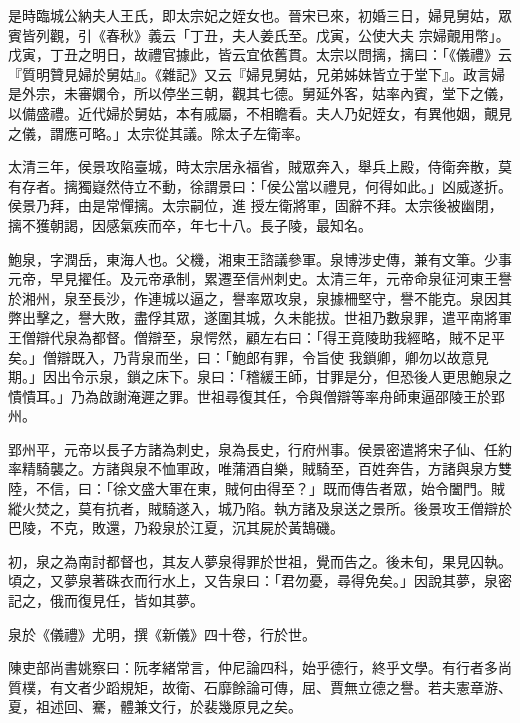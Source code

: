 \begin{pinyinscope}
 是時臨城公納夫人王氏，即太宗妃之姪女也。晉宋已來，初婚三日，婦見舅姑，眾賓皆列觀，引《春秋》義云「丁丑，夫人姜氏至。戊寅，公使大夫
 宗婦覿用幣」。戊寅，丁丑之明日，故禮官據此，皆云宜依舊貫。太宗以問摛，摛曰：「《儀禮》云『質明贊見婦於舅姑』。《雜記》又云『婦見舅姑，兄弟姊妹皆立于堂下』。政言婦是外宗，未審嫻令，所以停坐三朝，觀其七德。舅延外客，姑率內賓，堂下之儀，以備盛禮。近代婦於舅姑，本有戚屬，不相瞻看。夫人乃妃姪女，有異他姻，覿見之儀，謂應可略。」太宗從其議。除太子左衛率。



 太清三年，侯景攻陷臺城，時太宗居永福省，賊眾奔入，舉兵上殿，侍衛奔散，莫有存者。摛獨嶷然侍立不動，徐謂景曰：「侯公當以禮見，何得如此。」凶威遂折。侯景乃拜，由是常憚摛。太宗嗣位，進
 授左衛將軍，固辭不拜。太宗後被幽閉，摛不獲朝謁，因感氣疾而卒，年七十八。長子陵，最知名。



 鮑泉，字潤岳，東海人也。父機，湘東王諮議參軍。泉博涉史傳，兼有文筆。少事元帝，早見擢任。及元帝承制，累遷至信州刺史。太清三年，元帝命泉征河東王譽於湘州，泉至長沙，作連城以逼之，譽率眾攻泉，泉據柵堅守，譽不能克。泉因其弊出擊之，譽大敗，盡俘其眾，遂圍其城，久未能拔。世祖乃數泉罪，遣平南將軍王僧辯代泉為都督。僧辯至，泉愕然，顧左右曰：「得王竟陵助我經略，賊不足平矣。」僧辯既入，乃背泉而坐，曰：「鮑郎有罪，令旨使
 我鎖卿，卿勿以故意見期。」因出令示泉，鎖之床下。泉曰：「稽緩王師，甘罪是分，但恐後人更思鮑泉之憒憒耳。」乃為啟謝淹遲之罪。世祖尋復其任，令與僧辯等率舟師東逼邵陵王於郢州。



 郢州平，元帝以長子方諸為刺史，泉為長史，行府州事。侯景密遣將宋子仙、任約率精騎襲之。方諸與泉不恤軍政，唯蒲酒自樂，賊騎至，百姓奔告，方諸與泉方雙陸，不信，曰：「徐文盛大軍在東，賊何由得至？」既而傳告者眾，始令闔門。賊縱火焚之，莫有抗者，賊騎遂入，城乃陷。執方諸及泉送之景所。後景攻王僧辯於巴陵，不克，敗還，乃殺泉於江夏，沉其屍於黃鵠磯。



 初，泉之為南討都督也，其友人夢泉得罪於世祖，覺而告之。後未旬，果見囚執。頃之，又夢泉著硃衣而行水上，又告泉曰：「君勿憂，尋得免矣。」因說其夢，泉密記之，俄而復見任，皆如其夢。



 泉於《儀禮》尤明，撰《新儀》四十卷，行於世。



 陳吏部尚書姚察曰：阮孝緒常言，仲尼論四科，始乎德行，終乎文學。有行者多尚質樸，有文者少蹈規矩，故衛、石靡餘論可傳，屈、賈無立德之譽。若夫憲章游、夏，祖述回、騫，體兼文行，於裴幾原見之矣。



\end{pinyinscope}